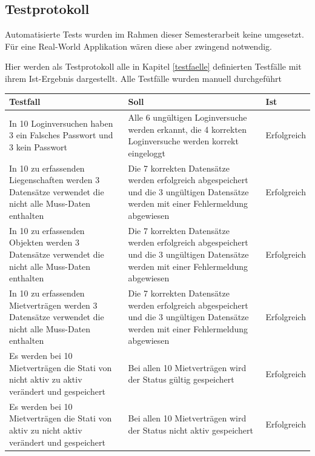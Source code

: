 \newpage
\subsection{Testprotokoll}
Automatisierte Tests wurden im Rahmen dieser Semesterarbeit keine umgesetzt. Für eine Real-World Applikation wären diese aber zwingend notwendig.

Hier werden als Testprotokoll alle in Kapitel \ref{testfaelle} definierten Testfälle mit ihrem Ist-Ergebnis dargestellt. Alle Testfälle wurden manuell durchgeführt

\begin{table}[H]
  \centering
  \settowidth{}
  \setlength\extrarowheight{2pt}
  \begin{tabulary}{1.0\textwidth}{|L|L|m{2cm}|}
    \hline
    \textbf{Testfall}& 
    \textbf{Soll} &
    \textbf{Ist}\\
    \hline
    In 10 Loginversuchen haben 3 ein Falsches Passwort und 3 kein Passwort & Alle 6 ungültigen Loginversuche werden erkannt, die 4 korrekten Loginversuche werden korrekt eingeloggt &  Erfolgreich\\
    \hline
    In 10 zu erfassenden Liegenschaften werden 3 Datensätze verwendet die nicht alle Muss-Daten enthalten & Die 7 korrekten Datensätze werden erfolgreich abgespeichert und die 3 ungültigen Datensätze werden mit einer Fehlermeldung abgewiesen &  Erfolgreich\\
    \hline
    In 10 zu erfassenden Objekten werden 3 Datensätze verwendet die nicht alle Muss-Daten enthalten & Die 7 korrekten Datensätze werden erfolgreich abgespeichert und die 3 ungültigen Datensätze werden mit einer Fehlermeldung abgewiesen &  Erfolgreich\\
    \hline
    In 10 zu erfassenden Mietverträgen werden 3 Datensätze verwendet die nicht alle Muss-Daten enthalten & Die 7 korrekten Datensätze werden erfolgreich abgespeichert und die 3 ungültigen Datensätze werden mit einer Fehlermeldung abgewiesen & Erfolgreich\\
    \hline
    Es werden bei 10 Mietverträgen die Stati von nicht aktiv zu aktiv verändert und gespeichert & Bei allen 10 Mietverträgen wird der Status gültig gespeichert &  Erfolgreich\\
    \hline
    Es werden bei 10 Mietverträgen die Stati von aktiv zu nicht aktiv verändert und gespeichert & Bei allen 10 Mietverträgen wird der Status nicht aktiv gespeichert &  Erfolgreich\\

\end{tabulary}
\end{table}
